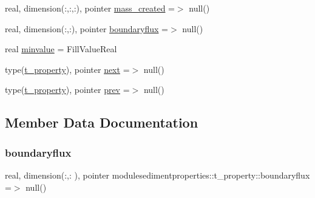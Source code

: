 \begin{DoxyCompactItemize}
real, dimension(\+:,\+:,\+:), pointer \mbox{\hyperlink{structmodulesedimentproperties_1_1t__property_a942c84631494fd73c5b44c381d1abfbe}{mass\+\_\+created}} =$>$ null()
\item 
real, dimension(\+:,\+:), pointer \mbox{\hyperlink{structmodulesedimentproperties_1_1t__property_a9abab2d3a9397ed91fb149c1b4816796}{boundaryflux}} =$>$ null()
\item 
real \mbox{\hyperlink{structmodulesedimentproperties_1_1t__property_a65eccf1f14ab1f52e28139b5243b1876}{minvalue}} = Fill\+Value\+Real
\item 
type(\mbox{\hyperlink{structmodulesedimentproperties_1_1t__property}{t\+\_\+property}}), pointer \mbox{\hyperlink{structmodulesedimentproperties_1_1t__property_a60e451790b62d97e641b25d8459fee22}{next}} =$>$ null()
\item 
type(\mbox{\hyperlink{structmodulesedimentproperties_1_1t__property}{t\+\_\+property}}), pointer \mbox{\hyperlink{structmodulesedimentproperties_1_1t__property_a5e3c23b461f5c79078a9d63483ab64e2}{prev}} =$>$ null()
\end{DoxyCompactItemize}


\subsection{Member Data Documentation}
\mbox{\label{structmodulesedimentproperties_1_1t__property_a9abab2d3a9397ed91fb149c1b4816796}} 
\subsubsection{\texorpdfstring{boundaryflux}{boundaryflux}}
{\footnotesize\ttfamily real, dimension(\+:,\+:  ), pointer modulesedimentproperties\+::t\+\_\+property\+::boundaryflux =$>$ null()\hspace{0.3cm}{\ttfamily [private]}}

\mbox{\label{structmodulesedimentproperties_1_1t__property_af69140711ab266b0da12299b2caf8f5f}} 
